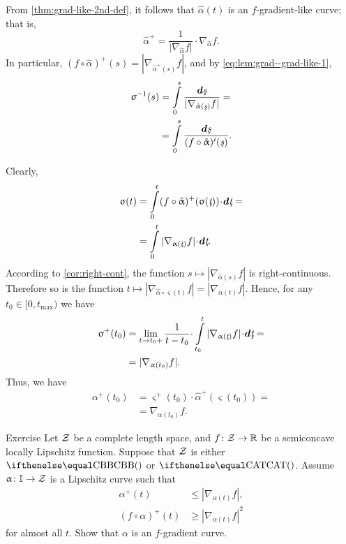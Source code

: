 From \ref{thm:grad-like-2nd-def}, it follows that $\hat\alpha(t)$ is an $f$-gradient-like curve; 
that is,
\[\hat\alpha^+=\frac{1}{|\nabla_{\hat\alpha} f|}\cdot\nabla_{\hat\alpha} f.\]
In particular, $(f\circ\hat\alpha)^+(s)=|\nabla_{\hat\alpha^+(s)} f|$, and by \ref{eq:lem:grad--grad-like-1},
\begin{align*}\varsigma^{-1}(s)
&=\int\limits_0^s\frac{\dd\under s}{|\nabla_{\hat\alpha(\under s)} f|}
=
\\
&=
\int\limits_0^s\frac{\dd\under s}{(f\circ\hat\alpha)'(\under s)}.
\end{align*}
\medskip

Clearly,
\begin{align*}\varsigma(t)
&=
\int\limits_0^{t}(f\circ\hat\alpha)^+(\varsigma(\under t))\cdot\dd \under t
=
\\
&=
\int\limits_0^{t}|\nabla_{\alpha(\under t)}f|\cdot\dd \under t.
\end{align*}
According to \ref{cor:right-cont}, the function $s\mapsto|\nabla_{\hat\alpha(s)}f|$ is right-continuous.
Therefore so is the function $t\mapsto|\nabla_{\hat\alpha\circ\varsigma(t)}f|=|\nabla_{\alpha(t)}f|$.
Hence, for any $t_0\in[0,t_{\max})$ we have
\begin{align*}\varsigma^+(t_0)
&=
\lim_{t\to t_0+}
\frac1{t-t_0}\cdot\int\limits_{t_0}^t
|\nabla_{\alpha(\under t)}f|\cdot\dd\under t
=
\\
&=
|\nabla_{\alpha(t_0)}f|.
\end{align*}
Thus, we have 
\begin{align*}\alpha^+(t_0)
&=
\varsigma^+(t_0)\cdot\hat\alpha^+(\varsigma(t_0))
=
\\
&=
\nabla_{\alpha(t_0)} f.
\end{align*}
\qedsf


\begin{thm}{Exercise}\label{ex:grad-curve-condition}
Let $\mathcal{Z}$ be a complete length space, and 
$f\:\spc{Z}\to \RR$ be a semiconcave locally Lipschitz 
function.
Suppose that $\mathcal{Z}$ is either $\Alex{}$ or $\CAT{}$.
Assume $\alpha\:\II\to \spc{Z}$ is a Lipschitz curve such that 
\begin{align*}
\alpha^+(t)&\le|\nabla_{\alpha(t)}f|,
\\
(f\circ\alpha)^+(t)&\ge |\nabla_{\alpha(t)}f|^2
\end{align*}
for almost all $t$.
Show that $\alpha$ is an $f$-gradient curve.
\end{thm}



